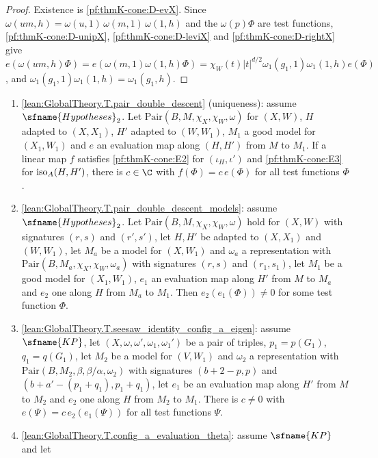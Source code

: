 \begin{proof}
Existence is \ref{pf:thmK-cone:D-evX}.  Since $\omega(um,h)=\omega(u,1)\,\omega(m,1)\,\omega(1,h)$ and the $\omega(p)\Phi$
are test functions, \ref{pf:thmK-cone:D-unipX}, \ref{pf:thmK-cone:D-leviX} and \ref{pf:thmK-cone:D-rightX} give
$e(\omega(um,h)\Phi)=e(\omega(m,1)\omega(1,h)\Phi)=\chi_W(t)|t|^{d/2}\omega_1(g_1,1)\omega_1(1,h)e(\Phi)$, and
$\omega_1(g_1,1)\omega_1(1,h)=\omega_1(g_1,h)$.
\end{proof}

\begin{enumerate}[resume*=thmKconeD]
\item\label{pf:thmK-cone:D-pairdesc} \cref{lean:GlobalTheory.T.pair_double_descent} (uniqueness): assume
  $\sfname{Hypotheses}_2$.  Let $\mathrm{Pair}(B,M,\chi_X,\chi_W,\omega)$ for $(X,W)$, $H$ adapted to $(X,X_1)$, $H'$
  adapted to $(W,W_1)$, $M_1$ a good model for $(X_1,W_1)$ and $e$ an evaluation map along $(H,H')$ from $M$ to
  $M_1$.  If a linear map $f$ satisfies \ref{pf:thmK-cone:E2} for $(\iota_H,\iota')$ and \ref{pf:thmK-cone:E3} for
  $\operatorname{iso}_A(H,H')$, there is $c\in\C$ with $f(\Phi)=c\,e(\Phi)$ for all test functions $\Phi$.
\item\label{pf:thmK-cone:D-pairdescnz} \cref{lean:GlobalTheory.T.pair_double_descent_models}: assume
  $\sfname{Hypotheses}_2$.  Let $\mathrm{Pair}(B,M,\chi_X,\chi_W,\omega)$ hold for $(X,W)$ with signatures $(r,s)$ and
  $(r',s')$, let $H,H'$ be adapted to $(X,X_1)$ and $(W,W_1)$, let $M_a$ be a model for $(X,W_1)$ and $\omega_a$ a
  representation with $\mathrm{Pair}(B,M_a,\chi_X,\chi_W,\omega_a)$ with signatures $(r,s)$ and $(r_1,s_1)$, let $M_1$ be a
  good model for $(X_1,W_1)$, $e_1$ an evaluation map along $H'$ from $M$ to $M_a$ and $e_2$ one along $H$ from $M_a$ to
  $M_1$.  Then $e_2(e_1(\Phi))\neq0$ for some test function $\Phi$.
\item\label{pf:thmK-cone:D-seesaw} \cref{lean:GlobalTheory.T.seesaw_identity_config_a_eigen}: assume $\sfname{KP}$, let
  $(X,\omega,\omega',\omega_1,\omega_1')$ be a pair of triples, $p_1=p(G_1)$, $q_1=q(G_1)$, let $M_2$ be a model for
  $(V,W_1)$ and $\omega_2$ a representation with $\mathrm{Pair}(B,M_2,\beta,\beta/\alpha,\omega_2)$ with signatures
  $(b+2-p,p)$ and $(b+a'-(p_1+q_1),p_1+q_1)$, let $e_1$ be an evaluation map along $H'$ from $M$ to $M_2$ and $e_2$ one
  along $H$ from $M_2$ to $M_1$.  There is $c\neq0$ with $e(\Psi)=c\,e_2(e_1(\Psi))$ for all test functions $\Psi$.
\item\label{pf:thmK-cone:D-eigen} \cref{lean:GlobalTheory.T.config_a_evaluation_theta}: assume $\sfname{KP}$ and let

\end{enumerate}
